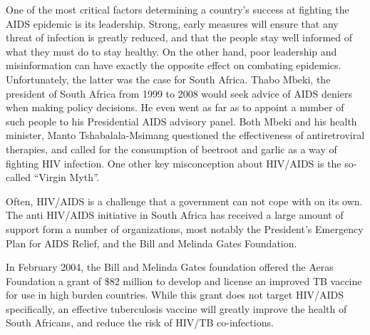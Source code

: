 \documentclass[12pt]{report}
\begin{document}
One of the most critical factors determining a country's success at fighting the AIDS epidemic is its leadership.  
Strong, early measures will ensure that any threat of infection is greatly reduced, and that the people stay well informed of what they must do to stay healthy.
On the other hand, poor leadership and misinformation can have exactly the opposite effect on combating epidemics.
Unfortunately, the latter was the case for South Africa.
Thabo Mbeki, the president of South Africa from 1999 to 2008 would seek advice of AIDS deniers when making policy decisions.  
He even went as far as to appoint a number of such people to his Presidential AIDS advisory panel.  
Both Mbeki and his health minister, Manto Tshabalala-Msimang questioned the effectiveness of antiretroviral therapies, and called for the consumption of beetroot and garlic as a way of fighting HIV infection.
One other key misconception about HIV/AIDS is the so-called ``Virgin Myth''.


Often, HIV/AIDS is a challenge that a government can not cope with on its own.  
The anti HIV/AIDS initiative in South Africa has received a large amount of support form a number of organizations, most notably the President's Emergency Plan for AIDS Relief, and the Bill and Melinda Gates Foundation.


In February 2004, the Bill and Melinda Gates foundation offered the Aeras Foundation a grant of \$82 million to develop and license an improved TB vaccine for use in high burden countries\cite{gates}.
While this grant does not target HIV/AIDS specifically, an effective tuberculosis vaccine will greatly improve the health of South Africans, and reduce the risk of HIV/TB co-infections.
\end{document}

